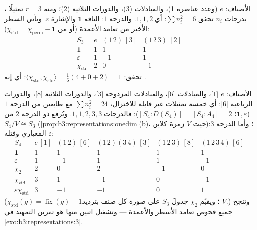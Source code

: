 \begin{example}[جدول $S_3$]\label{ex:b3:representations:s3}
الأصناف: $e$ (وعدد عناصره 1)، والمبادلات (3)، والدورات الثلاثية
(2)؛ ومنه $r
= 3$ تمثيلًا ، بدرجات $n_i$ تحقق
$\sum n_i^2 = 6$: أي $1, 1,
2$. والدرجة $1$:  التافه
$\mathbf 1$ والإشارة $\varepsilon$. ويأتي السطر الأخير من تعامد
الأعمدة (أو من $\chi_{\mathrm{std}} = \chi_{\mathrm{perm}} - \mathbf 1$):
\[
\begin{array}{c|ccc}
S_3 & e & (1\,2)\ [3] & (1\,2\,3)\ [2]\\
\hline
\mathbf 1 & 1 & 1 & 1\\
\varepsilon & 1 & -1 & 1\\
\chi_{\mathrm{std}} & 2 & 0 & -1
\end{array}
\]
تحقق: $\langle\chi_{\mathrm{std}},\chi_{\mathrm{std}}\rangle =
\frac{1}{6}(4 + 0 + 2) = 1$: أي إنه .
\end{example}

\begin{example}[جدول $S_4$]\label{ex:b3:representations:s4}
الأصناف: $e$ [1]، والمبادلات [6]، والمبادلات المزدوجة [3]،
والدورات الثلاثية [8]، والدورات الرباعية [6]: أي خمسة تمثيلات
غير قابلة للاختزال، $\sum n_i^2 =
24$ مع طابعين من الدرجة $1$ ($\mathbf 1, \varepsilon$؛
$[S_4 :
D(S_4)] = [S_4 : A_4] = 2$): فالدرجات $1, 1, 2, 3, 3$. ويُرفع  ذو الدرجة $2$
من $S_4/V \cong S_3$ (\cref{prop:b3:representations:onedim}(b)، حيث $V$ زمرة كلاين)؛ وأما الدرجة
$3$:  المعياري وفتله  $\varepsilon$:
\[
\begin{array}{c|ccccc}
S_4 & e\,[1] & (1\,2)\,[6] & (1\,2)(3\,4)\,[3] &
(1\,2\,3)\,[8] & (1\,2\,3\,4)\,[6]\\
\hline
\mathbf 1 & 1 & 1 & 1 & 1 & 1\\
\varepsilon & 1 & -1 & 1 & 1 & -1\\
\chi_2 & 2 & 0 & 2 & -1 & 0\\
\chi_{\mathrm{std}} & 3 & 1 & -1 & 0 & -1\\
\varepsilon\chi_{\mathrm{std}} & 3 & -1 & -1 & 0 & 1
\end{array}
\]
($\chi_{\mathrm{std}}(g) = \operatorname{fix}(g) - 1$؛ ويقيّم $\chi_2$ جدولَ $S_3$ على صورة كل صنف بترديد
$V$.) وتنجح جميع فحوص تعامد الأسطر والأعمدة --- وتشغيل اثنين
منها هو تمرين التمهيد في \cref{exo:b3:representations:3}.
\end{example}

